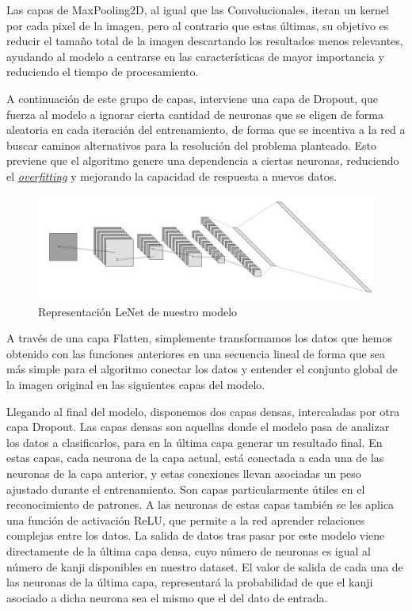 \documentclass{article}
\begin{document}
Las capas de MaxPooling2D, al igual que las Convolucionales, iteran un kernel por cada pixel de la imagen, pero al contrario que estas últimas, su objetivo es reducir el tamaño total de la imagen descartando los resultados menos relevantes, ayudando al modelo a  centrarse en las características de mayor importancia y reduciendo el tiempo de procesamiento.

A continuación de este grupo de capas, interviene una capa de Dropout, que fuerza al modelo a ignorar cierta cantidad de neuronas que se eligen de forma aleatoria en cada iteración del entrenamiento, de forma que se incentiva a la red a buscar caminos alternativos para la resolución del problema planteado. Esto previene que el algoritmo genere una dependencia a ciertas neuronas, reduciendo el \hyperref[sec:terms]{\textit{overfitting}\tec} y mejorando la capacidad de respuesta a nuevos datos.

\begin{figure}[!ht]
	\centering
	\label{fig:model}
	\includegraphics[scale=0.3]{pics/LeNetStyle.png}
	\caption{Representación LeNet de nuestro modelo}
\end{figure}

A través de una capa Flatten, simplemente transformamos los datos que hemos obtenido con las funciones anteriores en una secuencia lineal de forma que sea más simple para el algoritmo conectar los datos y entender el conjunto global de la imagen original en las siguientes capas del modelo.

Llegando al final del modelo, disponemos dos capas densas, intercaladas por otra capa Dropout. Las capas densas son aquellas donde el modelo pasa de analizar los datos a clasificarlos, para en la última capa generar un resultado final. En estas capas, cada neurona de la capa actual, está conectada a cada una de las neuronas de la capa anterior, y estas conexiones llevan asociadas un peso ajustado durante el entrenamiento. Son capas particularmente útiles en el reconocimiento de patrones. A las neuronas de estas capas también se les aplica una función de activación ReLU, que permite a la red aprender relaciones complejas entre los datos. La salida de datos tras pasar por este modelo viene directamente de la última capa densa, cuyo número de neuronas es igual al número de kanji disponibles en nuestro dataset. El valor de salida de cada una de las neuronas de la última capa, representará la probabilidad de que el kanji asociado a dicha neurona sea el mismo que el del dato de entrada.
\end{document}
